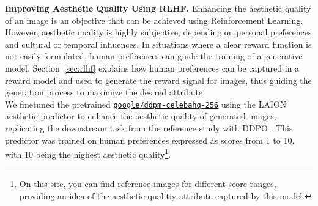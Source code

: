 
\noindent \textbf{Improving Aesthetic Quality Using RLHF.} Enhancing the aesthetic quality of an image is an objective that can be achieved using Reinforcement Learning. However, aesthetic quality is highly subjective, depending on personal preferences and cultural or temporal influences. In situations where a clear reward function is not easily formulated, human preferences can guide the training of a generative model. Section~\ref{sec:rlhf} explains how human preferences can be captured in a reward model and used to generate the reward signal for images, thus guiding the generation process to maximize the desired attribute. \\

\noindent We finetuned the pretrained \href{https://huggingface.co/google/ddpm-celebahq-256}{\texttt{\texttt{google/ddpm-celebahq-256}}} using the LAION aesthetic predictor \cite{laion2022} to enhance the aesthetic quality of generated images, replicating the downstream task from the reference study with DDPO \cite{black2023training}. This predictor was trained on human preferences expressed as scores from 1 to 10, with 10 being the highest aesthetic quality\footnote{On this \href{http://captions.christoph-schuhmann.de/aesthetic_viz_laion_sac+logos+ava1-l14-linearMSE-en-2.37B.html}{site, you can find reference images} for different score ranges, providing an idea of the aesthetic qualitiy attribute captured by this model.}. \\


